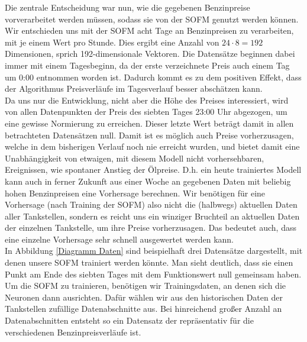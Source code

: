 \documentclass[11pt]{article}
\begin{document}
	Die zentrale Entscheidung war nun, wie die gegebenen Benzinpreise vorverarbeitet werden müssen, sodass sie von der SOFM genutzt werden können. Wir entschieden uns mit der SOFM acht Tage an Benzinpreisen zu verarbeiten, mit je einem Wert pro Stunde. Dies ergibt eine Anzahl von $ 24 \cdot 8 = 192 $ Dimensionen, sprich 192-dimensionale Vektoren. Die Datensätze beginnen dabei immer mit einem Tagesbeginn, da der erste verzeichnete Preis auch einem Tag um 0:00 entnommen worden ist. Dadurch kommt es zu dem positiven Effekt, dass der Algorithmus Preisverläufe im Tagesverlauf besser abschätzen kann.\\
	Da uns nur die Entwicklung, nicht aber die Höhe des Preises interessiert, wird von allen Datenpunkten der Preis des siebten Tages 23:00 Uhr abgezogen, um eine gewisse Normierung zu erreichen. Dieser letzte Wert beträgt damit in allen betrachteten Datensätzen null. Damit ist es möglich auch Preise vorherzusagen, welche in dem bisherigen Verlauf noch nie erreicht wurden, und bietet damit eine Unabhängigkeit von etwaigen, mit diesem Modell nicht vorhersehbaren, Ereignissen, wie spontaner Anstieg der Ölpreise. D.h. ein heute trainiertes Modell kann auch in ferner Zukunft aus einer Woche an gegebenen Daten mit beliebig hohen Benzinpreisen eine Vorhersage berechnen. Wir benötigen für eine Vorhersage (nach Training der SOFM) also nicht die (halbwegs) aktuellen Daten aller Tankstellen, sondern es reicht uns ein winziger Bruchteil an aktuellen Daten der einzelnen Tankstelle, um ihre Preise vorherzusagen. Das bedeutet auch, dass eine einzelne Vorhersage sehr schnell ausgewertet werden kann.\\
	In Abbildung \ref{Diagramm Daten} sind beispielhaft drei Datensätze dargestellt, mit denen unsere SOFM trainiert werden könnte. Man sieht deutlich, dass sie einen Punkt am Ende des siebten Tages mit dem Funktionswert null gemeinsam haben. \\
	Um die SOFM zu trainieren, benötigen wir Trainingsdaten, an denen sich die Neuronen dann ausrichten. Dafür wählen wir aus den historischen Daten der Tankstellen zufällige Datenabschnitte aus. Bei hinreichend großer Anzahl an Datenabschnitten entsteht so ein Datensatz der repräsentativ für die verschiedenen Benzinpreisverläufe ist.\\
	
\end{document}

